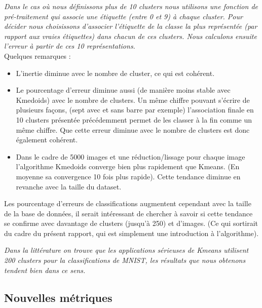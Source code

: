 \documentclass{article}
\begin{document}
\textit{Dans le cas où nous définissons plus de 10 clusters nous utilisons une fonction de pré-traitement qui associe une étiquette (entre 0 et 9) à chaque cluster. Pour décider nous choisissons d'associer l'étiquette de la classe la plus représentée (par rapport aux vraies étiquettes) dans chacun de ces clusters. Nous calculons ensuite l'erreur à partir de ces 10 représentations.} \\

Quelques remarques : 
\vspace{1mm}

\begin{itemize}
    \item L'inertie diminue avec le nombre de cluster, ce qui est cohérent.
    \vspace{1mm}
    
    \item Le pourcentage d'erreur diminue aussi (de manière moins stable avec Kmedoids) avec le nombre de clusters. Un même chiffre pouvant s'écrire de plusieurs façons, (sept avec et sans barre par exemple) l'association finale en 10 clusters présentée précédemment permet de les classer à la fin comme un même chiffre. Que cette erreur diminue avec le nombre de clusters est donc également cohérent.
    \vspace{1mm}
    
    \item Dans le cadre de 5000 images et une réduction/lissage pour chaque image l'algorithme Kmedoids converge bien plus rapidement que Kmeans. (En moyenne sa convergence 10 fois plus rapide). Cette tendance diminue en revanche avec la taille du dataset.
    
\end{itemize}
\vspace{2mm}

Les pourcentage d'erreurs de classifications augmentent cependant avec la taille de la base de données, il serait intéressant de chercher à savoir si cette tendance se confirme avec davantage de clusters (jusqu'à 250) et d'images. (Ce qui sortirait du cadre du présent rapport, qui est simplement une introduction à l'algorithme).

\vspace{1.5mm}
\textit{Dans la littérature on trouve que les applications sérieuses de Kmeans utilisent 200 clusters pour la classifications de MNIST, les résultats que nous obtenons tendent bien dans ce sens.}


\subsection{Nouvelles métriques}
\end{document}
